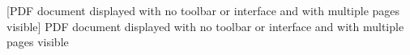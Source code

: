 [PDF document displayed with no toolbar or interface and with multiple pages visible]{%
 PDF document displayed with no toolbar or interface and with multiple pages visible
}%
